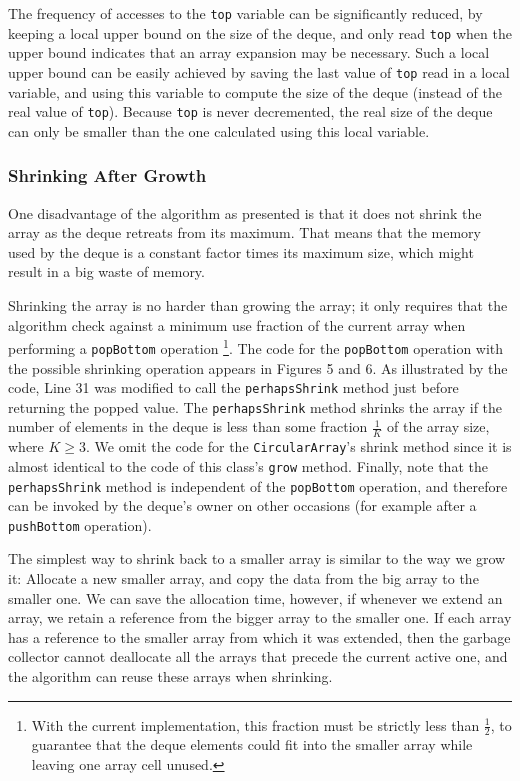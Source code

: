 The frequency of accesses to the \lstinline!top! variable can be
significantly reduced, by keeping a local upper bound on the size of
the deque, and only read \lstinline!top! when the upper bound
indicates that an array expansion may be necessary. Such a local upper
bound can be easily achieved by saving the last value of
\lstinline!top! read in a local variable, and using this variable to
compute the size of the deque (instead of the real value of
\lstinline!top!). Because \lstinline!top! is never decremented, the
real size of the deque can only be smaller than the one calculated
using this local variable.

\subsubsection{Shrinking After Growth}

One disadvantage of the algorithm as presented is that it does not
shrink the array as the deque retreats from its maximum. That means
that the memory used by the deque is a constant factor times its
maximum size, which might result in a big waste of memory.

Shrinking the array is no harder than growing the array; it only
requires that the algorithm check against a minimum use fraction of
the current array when performing a \lstinline!popBottom! operation
\footnote{With the current implementation, this fraction must be
  strictly less than $\frac{1}{2}$, to guarantee that the deque
  elements could fit into the smaller array while leaving one array
  cell unused.}. The code for the \lstinline!popBottom! operation with
the possible shrinking operation appears in Figures 5 and 6. As
illustrated by the code, Line 31 was modified to call the
\lstinline!perhapsShrink! method just before returning the popped
value. The \lstinline!perhapsShrink! method shrinks the array if the
number of elements in the deque is less than some fraction
$\frac{1}{K}$ of the array size, where $K \ge 3$. We omit the code for
the \lstinline!CircularArray!'s shrink method since it is almost
identical to the code of this class's \lstinline!grow! method.
Finally, note that the \lstinline!perhapsShrink! method is independent
of the \lstinline!popBottom! operation, and therefore can be invoked
by the deque's owner on other occasions (for example after a
\lstinline!pushBottom! operation).


The simplest way to shrink back to a smaller array is similar to the
way we grow it: Allocate a new smaller array, and copy the data from
the big array to the smaller one. We can save the allocation time,
however, if whenever we extend an array, we retain a reference from
the bigger array to the smaller one. If each array has a reference to
the smaller array from which it was extended, then the garbage
collector cannot deallocate all the arrays that precede the current
active one, and the algorithm can reuse these arrays when shrinking.

